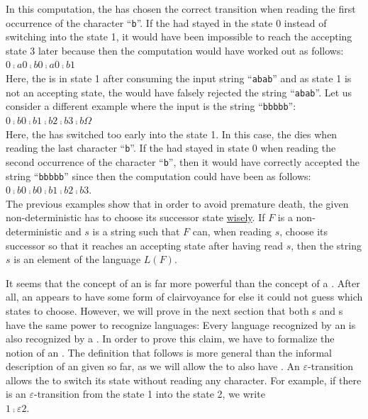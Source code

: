 In this computation, the  has chosen the correct transition when reading the first
occurrence of the character ``\texttt{b}''.  If the  had stayed in the state $0$ instead
of switching into the state 1, it would have been impossible to reach the accepting state 3 later
because then the computation would have worked out as follows:
\\[0.2cm]
\hspace*{1.3cm}
$0 \comp{a} 0 \comp{b} 0 \comp{a} 0 \comp{b} 1$
\\[0.2cm] 
Here, the  is in state 1 after consuming the input string ``\texttt{abab}'' and as state
1 is not an accepting state, the  would have falsely rejected the string ``\texttt{abab}''.
Let us consider a different example where the input is the string ``\texttt{bbbbb}'':
\\[0.2cm]
\hspace*{1.3cm}
$0 \comp{b} 0 \comp{b} 1 \comp{b} 2 \comp{b} 3 \comp{b} \Omega$
\\[0.2cm]
Here, the  has switched too early into the state 1.  In this case, the  dies
when reading the last character ``\texttt{b}''.  If the  had stayed in state $0$ when reading the second
occurrence of the character ``\texttt{b}'', then it would have correctly accepted the string
``\texttt{bbbbb}'' since then the computation could have been as follows:
\\[0.2cm]
\hspace*{1.3cm}
$0 \comp{b} 0 \comp{b} 0 \comp{b} 1 \comp{b} 2 \comp{b} 3$.
\\[0.2cm]
The previous examples show that in order to avoid premature death, the given non-deterministic  has
to choose its successor state
\href{https://www.youtube.com/watch?v=c3RN9zz77Cs}{wisely}.  
If $F$ is a non-deterministic  and $s$ is a string such that $F$ can, when reading $s$,
choose its successor so that it reaches an accepting state after having read $s$, then the string
$s$ is an element of the language $L(F)$.

It seems that the concept of an  is far more powerful than the 
concept of a .  After all, an  appears to have some form of clairvoyance for else it
could not guess which states to choose.  However, we will prove in the 
next section that both s and s have the same power to
recognize languages:  Every language recognized by an  is also
recognized by a .  In order to prove this claim, we have to
formalize the notion of an .  The definition that follows is more
general than the informal description of an  given so far, as we will
allow the  to also have .  An $\varepsilon$-transition
allows the  to switch its state without reading any character.  For example, if there is
an $\varepsilon$-transition from the state 1 into the state 2, we write
\\[0.2cm]
\hspace*{1.3cm}
$1 \comp{\varepsilon} 2$.


